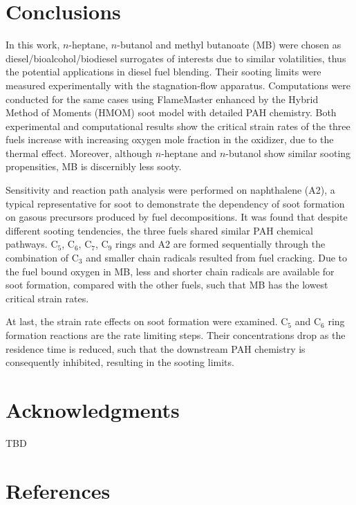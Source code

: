 \documentclass[preprint,3p,times,twocolumn]{elsarticleUS}
\begin{document}
\section{Conclusions}           

In this work, $n$-heptane, $n$-butanol and methyl butanoate (MB) were chosen as diesel/bioalcohol/biodiesel surrogates of interests due to similar volatilities, thus the potential applications in diesel fuel blending. Their sooting limits were measured experimentally with the stagnation-flow apparatus. Computations were conducted for the same cases using FlameMaster enhanced by the Hybrid Method of Moments (HMOM) soot model with detailed PAH chemistry. Both experimental and computational results show the critical strain rates of the three fuels increase with increasing oxygen mole fraction in the oxidizer, due to the thermal effect. Moreover, although $n$-heptane and $n$-butanol show similar sooting propensities, MB is discernibly less sooty.

Sensitivity and reaction path analysis were performed on naphthalene (A2), a typical representative for soot to demonstrate the dependency of soot formation on gasous precursors produced by fuel decompositions. It was found that despite different sooting tendencies, the three fuels shared similar PAH chemical pathways. C$_5$, C$_6$, C$_7$, C$_9$ rings and A2 are formed sequentially through the combination of C$_3$ and smaller chain radicals resulted from fuel cracking. Due to the fuel bound oxygen in MB, less and shorter chain radicals are available for soot formation, compared with the other fuels, such that MB has the lowest critical strain rates.

At last, the strain rate effects on soot formation were examined. C$_5$ and C$_6$ ring formation reactions are the rate limiting steps. Their concentrations drop as the residence time is reduced, such that the downstream PAH chemistry is consequently inhibited, resulting in the sooting limits. 

\section*{Acknowledgments}
TBD

\section*{References}



\renewcommand{\thefigure}{\arabic{figure}}
\renewcommand{\thetable}{\arabic{table}}
\end{document}
